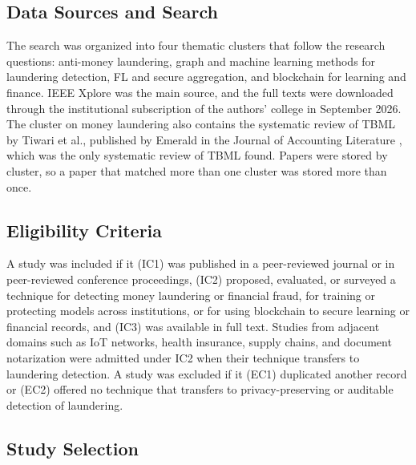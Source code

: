 \documentclass[journal]{IEEEtran}
\begin{document}
\subsection{Data Sources and Search}

The search was organized into four thematic clusters that follow the research questions: anti-money laundering, graph and machine learning methods for laundering detection, FL and secure aggregation, and blockchain for learning and finance. IEEE Xplore was the main source, and the full texts were downloaded through the institutional subscription of the authors' college in September 2026. The cluster on money laundering also contains the systematic review of TBML by Tiwari et al., published by Emerald in the Journal of Accounting Literature \cite{tiwari2025tbml}, which was the only systematic review of TBML found. Papers were stored by cluster, so a paper that matched more than one cluster was stored more than once.

\subsection{Eligibility Criteria}

A study was included if it (IC1) was published in a peer-reviewed journal or in peer-reviewed conference proceedings, (IC2) proposed, evaluated, or surveyed a technique for detecting money laundering or financial fraud, for training or protecting models across institutions, or for using blockchain to secure learning or financial records, and (IC3) was available in full text. Studies from adjacent domains such as IoT networks, health insurance, supply chains, and document notarization were admitted under IC2 when their technique transfers to laundering detection. A study was excluded if it (EC1) duplicated another record or (EC2) offered no technique that transfers to privacy-preserving or auditable detection of laundering.

\subsection{Study Selection}
\end{document}
